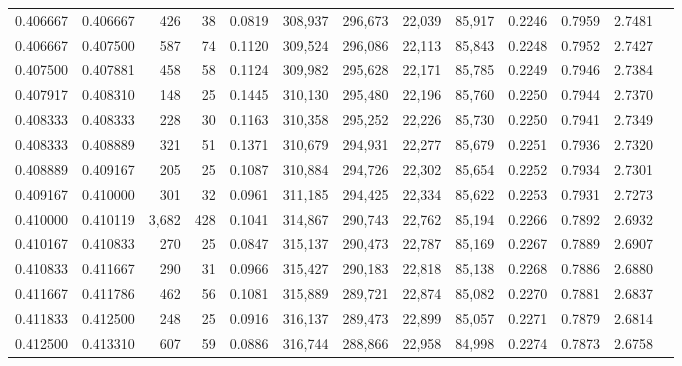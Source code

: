 \begin{tabular}{rrrrrrrrrrrrr}
0.406667 & 0.406667 &   426 &  38 &                                     0.0819 & 308,937 & 296,673 &  22,039 &  85,917 & 0.2246 & 0.7959 & 2.7481 \\
0.406667 & 0.407500 &   587 &  74 &                                     0.1120 & 309,524 & 296,086 &  22,113 &  85,843 & 0.2248 & 0.7952 & 2.7427 \\
0.407500 & 0.407881 &   458 &  58 &                                     0.1124 & 309,982 & 295,628 &  22,171 &  85,785 & 0.2249 & 0.7946 & 2.7384 \\
0.407917 & 0.408310 &   148 &  25 &                                     0.1445 & 310,130 & 295,480 &  22,196 &  85,760 & 0.2250 & 0.7944 & 2.7370 \\
0.408333 & 0.408333 &   228 &  30 &                                     0.1163 & 310,358 & 295,252 &  22,226 &  85,730 & 0.2250 & 0.7941 & 2.7349 \\
0.408333 & 0.408889 &   321 &  51 &                                     0.1371 & 310,679 & 294,931 &  22,277 &  85,679 & 0.2251 & 0.7936 & 2.7320 \\
0.408889 & 0.409167 &   205 &  25 &                                     0.1087 & 310,884 & 294,726 &  22,302 &  85,654 & 0.2252 & 0.7934 & 2.7301 \\
0.409167 & 0.410000 &   301 &  32 &                                     0.0961 & 311,185 & 294,425 &  22,334 &  85,622 & 0.2253 & 0.7931 & 2.7273 \\
0.410000 & 0.410119 & 3,682 & 428 &                                     0.1041 & 314,867 & 290,743 &  22,762 &  85,194 & 0.2266 & 0.7892 & 2.6932 \\
0.410167 & 0.410833 &   270 &  25 &                                     0.0847 & 315,137 & 290,473 &  22,787 &  85,169 & 0.2267 & 0.7889 & 2.6907 \\
0.410833 & 0.411667 &   290 &  31 &                                     0.0966 & 315,427 & 290,183 &  22,818 &  85,138 & 0.2268 & 0.7886 & 2.6880 \\
0.411667 & 0.411786 &   462 &  56 &                                     0.1081 & 315,889 & 289,721 &  22,874 &  85,082 & 0.2270 & 0.7881 & 2.6837 \\
0.411833 & 0.412500 &   248 &  25 &                                     0.0916 & 316,137 & 289,473 &  22,899 &  85,057 & 0.2271 & 0.7879 & 2.6814 \\
0.412500 & 0.413310 &   607 &  59 &                                     0.0886 & 316,744 & 288,866 &  22,958 &  84,998 & 0.2274 & 0.7873 & 2.6758 \\

\end{tabular}
